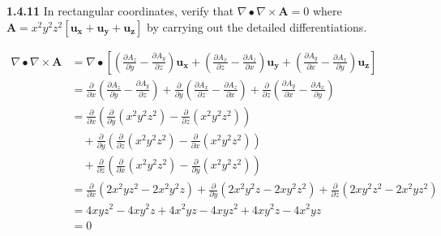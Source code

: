 \documentclass{article}
\begin{document}
\textbf{1.4.11} In rectangular coordinates, verify that $\nabla \bullet \nabla \times \mathbf{A} = 0$ where $\mathbf{A}
	= x^2 y^2 z^2 \left[\mathbf{u_x} + \mathbf{u_y} + \mathbf{u_z}\right]$ by carrying out the detailed differentiations.

\begin{equation*}
	\begin{split}
		\nabla \bullet \nabla \times \mathbf{A} & = \nabla \bullet \left[
			\left(\frac{\partial A_z}{\partial y} - \frac{\partial A_y}{\partial z}\right) \mathbf{u_x}
			+ \left(\frac{\partial A_x}{\partial z} - \frac{\partial A_z}{\partial x}\right) \mathbf{u_y}
			+ \left(\frac{\partial A_y}{\partial x} - \frac{\partial A_x}{\partial y}\right) \mathbf{u_z}
			\right] \\
		& = \frac{\partial}{\partial x}\left(\frac{\partial A_z}{\partial y} - \frac{\partial A_y}{\partial z}\right)
		+ \frac{\partial}{\partial y}\left(\frac{\partial A_x}{\partial z} - \frac{\partial A_z}{\partial x}\right)
		+ \frac{\partial}{\partial z}\left(\frac{\partial A_y}{\partial x} - \frac{\partial A_x}{\partial y}\right) \\
		& = \frac{\partial}{\partial x}\left(\frac{\partial}{\partial y}(x^2 y^2 z^2) - \frac{\partial}{\partial z}(x^2 y^2 z^2)\right) \\
		& \quad + \frac{\partial}{\partial y}\left(\frac{\partial}{\partial z}(x^2 y^2 z^2) - \frac{\partial}{\partial x}(x^2 y^2 z^2)\right) \\
		& \quad + \frac{\partial}{\partial z}\left(\frac{\partial}{\partial x}(x^2 y^2 z^2) - \frac{\partial}{\partial y}(x^2 y^2 z^2)\right) \\
		& = \frac{\partial}{\partial x}\left(2x^2yz^2 - 2x^2y^2z\right)
		+ \frac{\partial}{\partial y}\left(2x^2y^2z - 2 xy^2z^2\right)
		+ \frac{\partial}{\partial z}\left(2xy^2z^2 - 2x^2yz^2\right) \\
		& = 4xyz^2 - 4xy^2z + 4x^2yz - 4xyz^2 + 4xy^2z - 4x^2yz \\
		& = 0
	\end{split}
\end{equation*}
\end{document}

